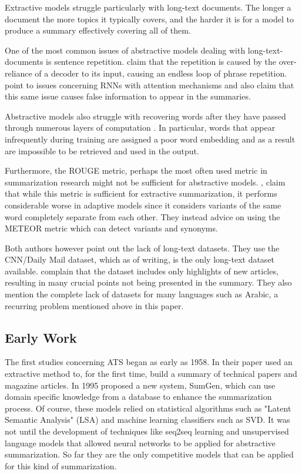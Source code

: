 \documentclass{article}
\begin{document}
	Extractive models struggle particularly with long-text documents\cite{xiao}. The longer a document the more topics it typically covers, and the harder it is for a model to produce a summary effectively covering all of them.\par
	
	One of the most common issues of abstractive models dealing with long-text-documents is sentence repetition. \cite{abigail} claim that the repetition is caused by the over-reliance of a decoder to its input, causing an endless loop of phrase repetition. \cite{suleiman} point to issues concerning RNNs with attention mechanisms and also claim that this same issue causes false information to appear in the summaries. \par
	
	Abstractive models also struggle with recovering words after they have passed through numerous layers of computation \cite{abigail}. In particular, words that appear infrequently during training are assigned a poor word embedding and as a result are impossible to be retrieved and used in the output. \par 
	
	Furthermore, the ROUGE metric, perhaps the most often used metric in summarization research might not be sufficient for abstractive models. \cite{suleiman}, claim that while this metric is sufficient for extractive summarization, it performs considerable worse in adaptive models since it considers variants of the same word completely separate from each other. They instead advice on using the METEOR metric which can detect variants and synonyms. \par
	
	Both authors however point out the lack of long-text datasets. They use the CNN/Daily Mail dataset, which as of writing, is the only long-text dataset available. \cite{suleiman} complain that the dataset includes only highlights of new articles, resulting in many crucial points not being presented in the summary. They also mention the complete lack of datasets for many languages such as Arabic, a recurring problem mentioned above in this paper. \par
	
	
	\subsection{Early Work}
	
	The first studies concerning ATS began as early as 1958. In their paper \cite{luhn} used an extractive method to, for the first time, build a summary  of technical papers and magazine articles. In 1995 \cite{maybury} proposed a new system, SumGen, which can use domain specific knowledge from a database to enhance the summarization process. Of course, these models relied on statistical algorithms such as "Latent Semantic Analysis" (LSA) and machine learning classifiers such as SVD. It was not until the development of techniques like seq2seq learning and unsupervised language models that allowed neural networks to be applied for abstractive summarization. So far they are the only competitive models that can be applied for this kind of summarization.
	
\end{document}
